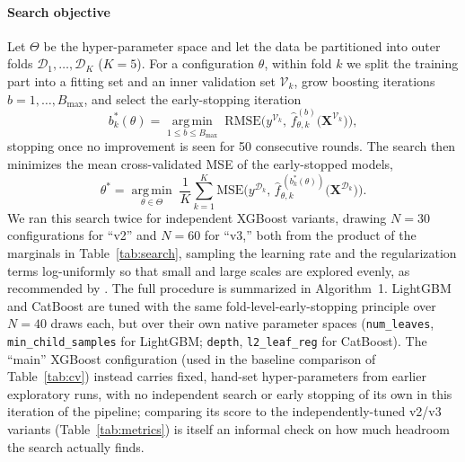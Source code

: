 \documentclass[journal]{IEEEtran}
\begin{document}
\paragraph{Search objective} Let $\Theta$ be the hyper-parameter space and let
the data be partitioned into outer folds $\mathcal{D}_1,\dots,\mathcal{D}_K$
($K=5$). For a configuration $\theta$, within fold $k$ we split the training part
into a fitting set and an inner validation set $\mathcal{V}_k$, grow boosting
iterations $b=1,\dots,B_{\max}$, and select the early-stopping iteration
\begin{equation}
b_k^{*}(\theta)=\operatorname*{arg\,min}_{1\le b\le B_{\max}}
\;\mathrm{RMSE}\!\Big(y^{\mathcal{V}_k},\,
\hat f^{(b)}_{\theta,k}\big(\mathbf{X}^{\mathcal{V}_k}\big)\Big),
\label{eq:earlystop}
\end{equation}
stopping once no improvement is seen for 50 consecutive rounds. The search then
minimizes the mean cross-validated MSE of the early-stopped models,
\begin{equation}
\theta^{*}=\operatorname*{arg\,min}_{\theta\in\Theta}\;
\frac{1}{K}\sum_{k=1}^{K}
\mathrm{MSE}\!\Big(y^{\mathcal{D}_k},\,
\hat f^{\,(b_k^{*}(\theta))}_{\theta,k}\big(\mathbf{X}^{\mathcal{D}_k}\big)\Big).
\label{eq:searchobj}
\end{equation}
We ran this search twice for independent XGBoost variants, drawing $N=30$
configurations for ``v2'' and $N=60$ for ``v3,'' both from the product of the
marginals in Table~\ref{tab:search}, sampling the learning rate and the
regularization terms log-uniformly so that small and large scales are explored
evenly, as recommended by \cite{bergstra2012random}. The full procedure is
summarized in Algorithm~1. LightGBM and CatBoost are tuned with the same
fold-level-early-stopping principle over $N=40$ draws each, but over their own
native parameter spaces (\texttt{num\_leaves}, \texttt{min\_child\_samples} for
LightGBM; \texttt{depth}, \texttt{l2\_leaf\_reg} for CatBoost). The ``main''
XGBoost configuration (used in the baseline comparison of
Table~\ref{tab:cv}) instead carries fixed, hand-set hyper-parameters from
earlier exploratory runs, with no independent search or early stopping of its
own in this iteration of the pipeline; comparing its score to the
independently-tuned v2/v3 variants (Table~\ref{tab:metrics}) is itself an
informal check on how much headroom the search actually finds.
\end{document}
